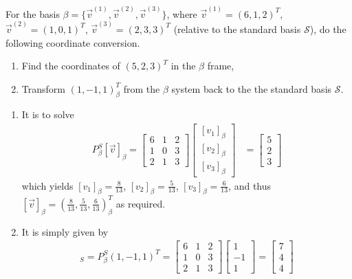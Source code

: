\begin{Exercise}
For the basis $\mathcal{\beta} = \{\vec{v}^{(1)}, \vec{v}^{(2)}, \vec{v}^{(3)}\}$, where $\vec{v}^{(1)} = (6,1,2)^T$,
$\vec{v}^{(2)} = (1,0,1)^T$,
$\vec{v}^{(3)} = (2,3,3)^T$
(relative to the standard basis $\mathcal{S}$), do the following coordinate conversion.
\begin{enumerate}[label=(\alph*)]
\item Find the coordinates of $(5, 2, 3)^T$ in the $\mathcal{\beta}$ frame,
\item Transform $(1, -1, 1)^T_\beta$ from the $\mathcal{\beta}$ system back to the the standard basis $\mathcal{S}$.
\end{enumerate}
\end{Exercise}
\begin{Answer}
\begin{enumerate}[label=(\alph*)]
\item It is to solve
\begin{align*}
P_\beta^S [\vec{v}]_\beta =
\begin{bmatrix}
6 & 1 & 2 \\
1 & 0 & 3 \\
2 & 1 & 3
\end{bmatrix}
\begin{bmatrix}
[v_1]_\beta \\
[v_2]_\beta \\
[v_3]_\beta
\end{bmatrix}
&=
\begin{bmatrix}
5 \\
2 \\
3
\end{bmatrix}
\end{align*}
which yields $[v_1]_\beta = \frac{8}{13}$, $[v_2]_\beta = \frac{5}{13}$, $[v_3]_\beta = \frac{6}{13}$, and thus $[\vec{v}]_{\beta} = (\frac{8}{13}, \frac{5}{13}, \frac{6}{13})_\beta^T$ as required.
\item It is simply given by
\begin{align*}
[\vec{v}]_S = P_\beta^S (1,-1,1)^T =
\begin{bmatrix}
6 & 1 & 2 \\
1 & 0 & 3 \\
2 & 1 & 3
\end{bmatrix}
\begin{bmatrix}
1 \\
-1 \\
1
\end{bmatrix}
=
\begin{bmatrix}
7 \\
4 \\
4
\end{bmatrix}
\end{align*}
\end{enumerate}
\end{Answer}

